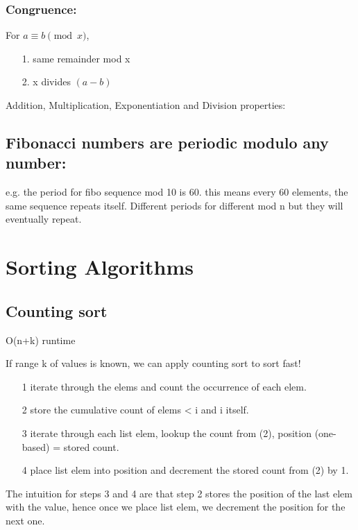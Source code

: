 \documentclass[12pt]{article}
\begin{document}
\subsubsection{Congruence:}
For \( a \equiv b \pmod{x} \), 

\begin{itemize} 
	\item[1.] same remainder mod x
	\item[2.] x divides \((a - b)\)
\end{itemize} 

Addition, Multiplication, Exponentiation and Division properties: 

\subsection{Fibonacci numbers are periodic modulo any number:}
e.g. the period for fibo sequence mod 10 is 60. this means every 60 elements, the same sequence repeats itself. 
Different periods for different mod n but they will eventually repeat. 

\section{Sorting Algorithms} 

\subsection{Counting sort}

O(n+k) runtime 

If range k of values is known, we can apply counting sort to sort fast! 

\begin{itemize} 
	\item[1] iterate through the elems and count the occurrence of each elem. 
	\item[2] store the cumulative count of elems < i and i itself. 
	\item[3] iterate through each list elem, lookup the count from (2), position (one-based) = stored count. 
	\item[4] place list elem into position and decrement the stored count from (2) by 1. 
\end{itemize} 

The intuition for steps 3 and 4 are that step 2 stores the position of the last elem with the value, hence once we place list elem, we decrement the position for the next one. 
\end{document}
